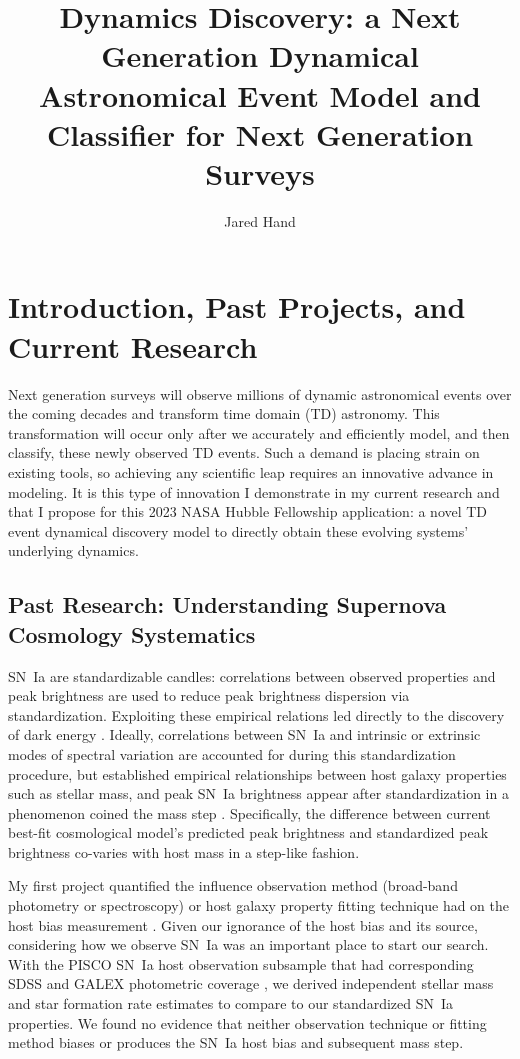 \documentclass[modern]{aastex631}
\begin{document}
\title{Dynamics Discovery: a Next Generation Dynamical Astronomical Event Model and Classifier for Next Generation Surveys}
\author[0000-0001-7260-4274]{Jared Hand}

\section{Introduction, Past Projects, and Current Research}
Next generation surveys will observe millions of dynamic astronomical events over the coming decades and transform time domain (TD) astronomy. 
This transformation will occur only after we accurately and efficiently model, and then classify, these newly observed TD events. 
Such a demand is placing strain on existing tools, so achieving any scientific leap requires an innovative advance in modeling. 
It is this type of innovation I demonstrate in my current research and that I propose for this 2023 NASA Hubble Fellowship application: a novel TD event dynamical discovery model to directly obtain these evolving systems' underlying dynamics. 

\subsection{Past Research: Understanding Supernova Cosmology Systematics}
SN~Ia are standardizable candles: correlations between observed properties and peak brightness are used to reduce peak brightness dispersion via standardization. 
Exploiting these empirical relations led directly to the discovery of dark energy \citep{Riess1998,Perlmutter99}. 
Ideally, correlations between SN~Ia and intrinsic or extrinsic modes of spectral variation are accounted for during this standardization procedure, but established empirical relationships between host galaxy properties such as stellar mass, and peak SN~Ia brightness appear after standardization in a phenomenon coined the mass step \citep{Sullivan10,Rigault18}. 
Specifically, the difference between current best-fit cosmological model's predicted peak brightness and standardized peak brightness co-varies with host mass in a step-like fashion. 

My first project quantified the influence observation method (broad-band photometry or spectroscopy) or host galaxy property fitting technique had on the host bias measurement \citep{Hand2022}. 
Given our ignorance of the host bias and its source, considering how we observe SN~Ia was an important place to start our search. 
With the PISCO SN~Ia host observation subsample \citep{Galbany2018} that had corresponding SDSS and GALEX photometric coverage \citep{Alam2018,Morrissey2007}, we derived independent stellar mass and star formation rate estimates to compare to our standardized SN~Ia properties. 
We found no evidence that neither observation technique or fitting method biases or produces the SN~Ia host bias and subsequent mass step.
\end{document}
